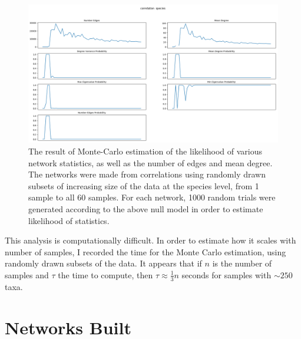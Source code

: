 \documentclass[10pt]{article}
\theoremstyle{definition}
\numberwithin{theorem}{section}
\numberwithin{definition}{section}
\numberwithin{lemma}{section}
\numberwithin{corollary}{section}
\numberwithin{clm}{section}
\numberwithin{rmk}{section}
\begin{document}
\begin{figure}
	\includegraphics[scale = 0.4]{../stat_figs/pears_1000__species.png}
	\caption{The result of Monte-Carlo estimation of the likelihood of various network statistics, as well as the number of edges and mean degree. The networks were made from correlations using randomly drawn subsets of increasing size of the data at the species level, from 1 sample to all 60 samples. For each network, 1000 random trials were generated according to the above null model in order to estimate likelihood of statistics.}\label{montecarlos}
\end{figure}

This analysis is computationally difficult. In order to estimate how it scales with number of samples, I recorded the time for the Monte Carlo estimation, using randomly drawn subsets of the data. It appears that if $n$ is the number of samples and $\tau$ the time to compute, then $\tau \approx \frac{1}{3} n$ seconds for samples with $\sim 250$ taxa. 

\section{Networks Built}
\end{document}
